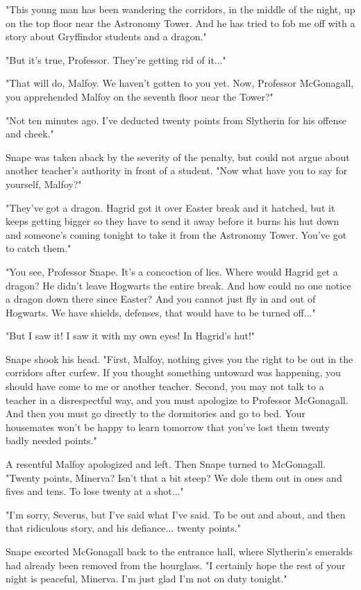 "This young man has been wandering the corridors, in the middle of the night, up on the top floor near the Astronomy Tower. And he has tried to fob me off with a story about Gryffindor students and a dragon."

"But it's true, Professor. They're getting rid of it..."

"That will do, Malfoy. We haven't gotten to you yet. Now, Professor McGonagall, you apprehended Malfoy on the seventh floor near the Tower?"

"Not ten minutes ago. I've deducted twenty points from Slytherin for his offense and cheek."

Snape was taken aback by the severity of the penalty, but could not argue about another teacher's authority in front of a student. "Now what have you to say for yourself, Malfoy?"

"They've got a dragon. Hagrid got it over Easter break and it hatched, but it keeps getting bigger so they have to send it away before it burns his hut down and someone's coming tonight to take it from the Astronomy Tower. You've got to catch them."

"You see, Professor Snape. It's a concoction of lies. Where would Hagrid get a dragon? He didn't leave Hogwarts the entire break. And how could no one notice a dragon down there since Easter? And you cannot just fly in and out of Hogwarts. We have shields, defenses, that would have to be turned off..."

"But I saw it! I saw it with my own eyes! In Hagrid's hut!"

Snape shook his head. "First, Malfoy, nothing gives you the right to be out in the corridors after curfew. If you thought something untoward was happening, you should have come to me or another teacher. Second, you may not talk to a teacher in a disrespectful way, and you must apologize to Professor McGonagall. And then you must go directly to the dormitories and go to bed. Your housemates won't be happy to learn tomorrow that you've lost them twenty badly needed points."

A resentful Malfoy apologized and left. Then Snape turned to McGonagall. "Twenty points, Minerva? Isn't that a bit steep? We dole them out in ones and fives and tens. To lose twenty at a shot..."

"I'm sorry, Severus, but I've said what I've said. To be out and about, and then that ridiculous story, and his defiance... twenty points."

Snape escorted McGonagall back to the entrance hall, where Slytherin's emeralds had already been removed from the hourglass. "I certainly hope the rest of your night is peaceful, Minerva. I'm just glad I'm not on duty tonight."

